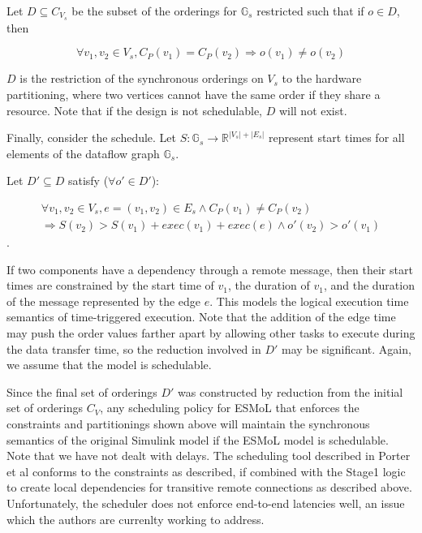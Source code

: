 Let $D \subseteq C_{V_s}$ be the subset of the orderings for $\mathbb{G}_s$
restricted such that if $o \in D$, then 

\begin{equation*}
\forall v_1,v_2 \in V_s, C_P(v_1) = C_P(v_2) \Rightarrow o(v_1) \neq o(v_2)
\end{equation*}
  
$D$ is the restriction of the 
synchronous orderings on $V_s$ to the hardware partitioning, where two vertices cannot have
the same order if they share a resource.  Note that if the design is not
schedulable, $D$ will not exist.

Finally, consider the schedule.  Let $S: \mathbb{G}_s \rightarrow \mathbb{R}^{|V_s|+|E_s|}$ represent start times for all elements of the dataflow graph $\mathbb{G}_s$. 

Let $D' \subseteq D$ satisfy ($\forall o' \in D'$):

\begin{gather*}
\forall v_1, v_2 \in V_s, e = (v_1, v_2) \in E_s \wedge C_P(v_1) \neq C_P(v_2) \\
\Rightarrow S(v_2) > S(v_1) + exec(v_1) + exec(e) \wedge o'(v_2) > o'(v_1)
\end{gather*}.  

If two components have a dependency through a remote message, then their start times are constrained by the start time of $v_1$, the duration of $v_1$, and the duration of the message represented by the edge $e$. This models the logical execution time semantics of time-triggered execution.  Note that the addition of the edge time may push the order values farther apart by allowing other tasks to execute during the data transfer time, so the reduction involved in $D'$ may be significant.  Again, we assume that the model is schedulable.

Since the final set of orderings $D'$ was constructed by reduction from the initial set of orderings $C_V$, any scheduling policy for ESMoL that enforces the 
constraints and partitionings shown above will maintain the synchronous 
semantics of the original Simulink model if the ESMoL model is schedulable.
Note that we have not dealt with delays.  The scheduling tool described in 
Porter et al\cite{sched:analysis} conforms to the constraints as described, if
combined with the Stage1 logic to create local dependencies for transitive remote connections as described above.  Unfortunately, the scheduler does not enforce end-to-end latencies well, an issue which the authors are currenlty working to address.


